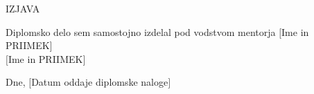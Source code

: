 \newpage\thispagestyle{empty}
%
\vspace*{3cm}
\begin{center}
\large{IZJAVA}
\end{center}
%
\begin{flushleft}
\bigskip \bigskip
Diplomsko delo sem samostojno izdelal pod vodstvom mentorja
$[$Ime in PRIIMEK$]$\\
%
\bigskip \bigskip \bigskip \hspace{12cm} $[$Ime in PRIIMEK$]$\\
\end{flushleft}
%
\bigskip \bigskip \bigskip \bigskip
Dne, $[$Datum oddaje diplomske naloge$]$